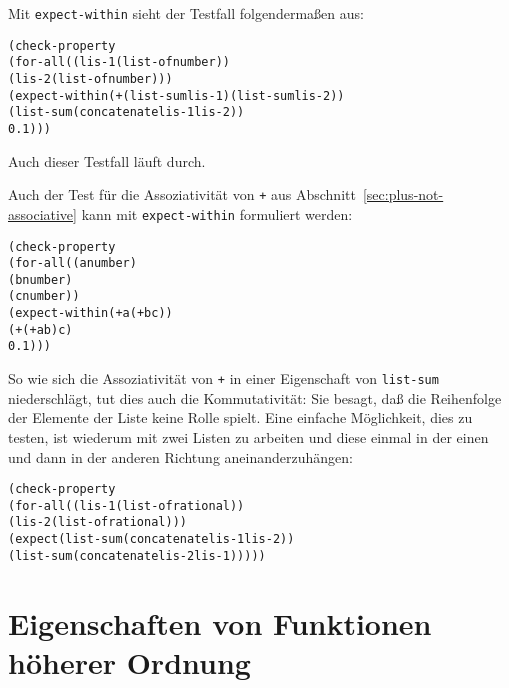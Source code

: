 Mit \texttt{expect-within} sieht der Testfall folgendermaßen aus:
%
\begin{alltt}
(check-property
 (for-all ((lis-1 (list-of number))
           (lis-2 (list-of number)))
    (expect-within (+ (list-sum lis-1) (list-sum lis-2))
                   (list-sum (concatenate lis-1 lis-2))
                   0.1)))
\end{alltt}
%
Auch dieser Testfall läuft durch.

Auch der Test für die Assoziativität von \texttt{+} aus
Abschnitt~\ref{sec:plus-not-associative} kann mit
\texttt{expect-within} formuliert werden:
%
\begin{alltt}
(check-property
 (for-all ((a number)
           (b number)
           (c number))
    (expect-within (+ a (+ b c))
                   (+ (+ a b) c)
                   0.1)))
\end{alltt}
%
So wie sich die Assoziativität von \texttt{+} in einer Eigenschaft von
\texttt{list-sum} niederschlägt, tut dies auch die Kommutativität: Sie
besagt, daß die Reihenfolge der Elemente der Liste keine Rolle spielt.
Eine einfache Möglichkeit, dies zu testen, ist wiederum mit zwei
Listen zu arbeiten und diese einmal in der einen und dann in der
anderen Richtung aneinanderzuhängen:\label{sec:list-sum-commutative}
%
\begin{alltt}
(check-property
 (for-all ((lis-1 (list-of rational))
           (lis-2 (list-of rational)))
   (expect (list-sum (concatenate lis-1 lis-2))
           (list-sum (concatenate lis-2 lis-1)))))
\end{alltt}

\section{Eigenschaften von Funktionen höherer Ordnung}
\label{sec:ho-props}

